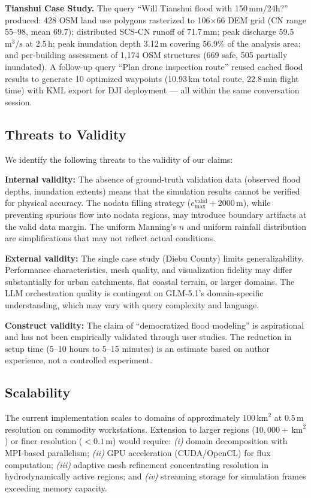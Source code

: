 \documentclass[11pt, a4paper]{article}
\begin{document}
\textbf{Tianshui Case Study.} The query ``Will Tianshui flood with 150\,mm/24h?'' produced: 428 OSM land use polygons rasterized to 106$\times$66 DEM grid (CN range 55--98, mean 69.7); distributed SCS-CN runoff of 71.7\,mm; peak discharge 59.5\,$\mathrm{m^3/s}$ at 2.5\,h; peak inundation depth 3.12\,m covering 56.9\% of the analysis area; and per-building assessment of 1{,}174 OSM structures (669 safe, 505 partially inundated). A follow-up query ``Plan drone inspection route'' reused cached flood results to generate 10 optimized waypoints (10.93\,km total route, 22.8\,min flight time) with KML export for DJI deployment --- all within the same conversation session.

\subsection{Threats to Validity}

We identify the following threats to the validity of our claims:

\textbf{Internal validity:} The absence of ground-truth validation data (observed flood depths, inundation extents) means that the simulation results cannot be verified for physical accuracy. The nodata filling strategy ($e_{\max}^{\text{valid}} + 2000$\,m), while preventing spurious flow into nodata regions, may introduce boundary artifacts at the valid data margin. The uniform Manning's $n$ and uniform rainfall distribution are simplifications that may not reflect actual conditions.

\textbf{External validity:} The single case study (Diebu County) limits generalizability. Performance characteristics, mesh quality, and visualization fidelity may differ substantially for urban catchments, flat coastal terrain, or larger domains. The LLM orchestration quality is contingent on GLM-5.1's domain-specific understanding, which may vary with query complexity and language.

\textbf{Construct validity:} The claim of ``democratized flood modeling'' is aspirational and has not been empirically validated through user studies. The reduction in setup time (5--10 hours to 5--15 minutes) is an estimate based on author experience, not a controlled experiment.

\subsection{Scalability}

The current implementation scales to domains of approximately $100\,\mathrm{km}^2$ at $0.5$\,m resolution on commodity workstations. Extension to larger regions ($10{,}000+\,\mathrm{km}^2$) or finer resolution ($<0.1$\,m) would require: \emph{(i)} domain decomposition with MPI-based parallelism; \emph{(ii)} GPU acceleration (CUDA/OpenCL) for flux computation; \emph{(iii)} adaptive mesh refinement concentrating resolution in hydrodynamically active regions; and \emph{(iv)} streaming storage for simulation frames exceeding memory capacity.
\end{document}
